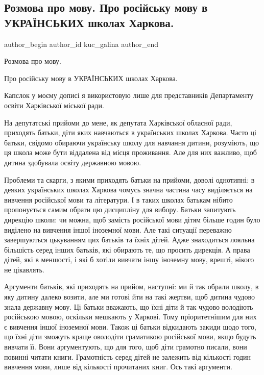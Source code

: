  
 
 
 
 
 
\subsection{Розмова про мову. Про російську мову в УКРАЇНСЬКИХ школах Харкова.}
\label{sec:22_07_2021.fb.kuc_galina.1.mova_harkov_shkoly}
 
\ifcmt
 author_begin
   author_id kuc_galina
 author_end
\fi

Розмова про мову.

Про російську мову в УКРАЇНСЬКИХ школах Харкова.

Капслок у моєму дописі я використовую лише для представників Департаменту
освіти Харківської міської ради.

На депутатські прийоми до мене, як депутата Харківської обласної ради,
приходять батьки, діти яких навчаються в українських школах Харкова. Часто ці
батьки, свідомо обираючи українську школу для навчання дитини, розуміють, що ця
школа може бути віддалена від місця проживання. Але для них важливо, щоб дитина
здобувала освіту державною мовою.

Проблеми та скарги, з якими приходять батьки на прийоми, доволі однотипні: в
деяких українських школах Харкова чомусь значна частина часу виділяється на
вивчення російської мови та літератури. І в таких школах батькам нібито
пропонується самим обрати цю дисципліну для вибору. Батьки запитують дирекцію
школи: чи можна, щоб замість російської мови дітям більше годин було виділено
на вивчення іншої іноземної мови. Але такі ситуації переважно завершуються
цькуванням цих батьків та їхніх дітей. Адже знаходиться лояльна більшість серед
інших батьків, які обирають те, що просить дирекція. А права дітей, які в
меншості, і які б хотіли вивчати іншу іноземну мову, врешті, нікого не
цікавлять. 

Аргументи батьків, які приходять на прийом, наступні: ми й так обрали школу, в
яку дитину далеко возити, але ми готові йти на такі жертви, щоб дитина чудово
знала державну мову. Ці батьки вважають, що їхні діти й так чудово володіють
російською мовою, оскільки мешкають у Харкові. Тому пріоритетнішим для них є
вивчення іншої іноземної мови. Також ці батьки відкидають закиди щодо того, що
їхні діти зможуть краще оволодіти граматикою російської мови, якщо будуть
вивчати її. Вони аргументують, що для того, щоб діти грамотно писали, вони
повинні читати книги. Грамотність серед дітей не залежить від кількості годин
вивчення мови, лише від кількості прочитаних книг. Ось такі аргументи.

